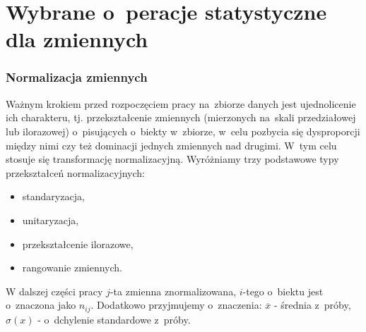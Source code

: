 \documentclass[12pt,a4paper]{report}
\begin{document}
\section{Wybrane o~peracje statystyczne dla zmiennych}\label{wybrane_operacje_statystyczne}
\subsubsection{Normalizacja zmiennych}
Ważnym krokiem przed rozpoczęciem pracy na~zbiorze danych jest ujednolicenie ich charakteru, tj. przekształcenie zmiennych (mierzonych na~skali przedziałowej lub ilorazowej) o~pisujących o~biekty w~zbiorze, w~celu pozbycia się dysproporcji między nimi czy też dominacji jednych zmiennych nad drugimi. W~tym celu stosuje się transformację normalizacyjną. Wyróżniamy trzy podstawowe typy przekształceń normalizacyjnych:
\begin{itemize}
\item standaryzacja,
\item unitaryzacja,
\item przekształcenie ilorazowe,
\item rangowanie zmiennych.
\end{itemize}
W dalszej części pracy $j$-ta zmienna znormalizowana, $i$-tego o~biektu jest o~znaczona jako $n_{ij}$. Dodatkowo przyjmujemy o~znaczenia: $\overline{x}$ - średnia z~próby, $\sigma{(x)}$ - o~dchylenie standardowe z~próby.
\end{document}
